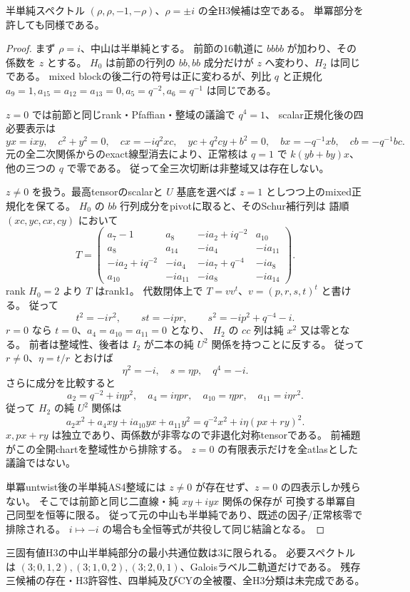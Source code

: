 \begin{theorem}
\label{thm:cubic-fourth-root-last-negative-simple-empty}
半単純スペクトル $(\rho,\rho,-1,-\rho)$、$\rho=\pm i$ の全H3候補は空である。
単冪部分を許しても同様である。
\end{theorem}
\begin{proof}
まず $\rho=i$、中山は半単純とする。
前節の16軌道に $bbbb$ が加わり、その係数を $z$ とする。
$H_0$ は前節の行列の $bb,bb$ 成分だけが $z$ へ変わり、$H_2$ は同じである。
mixed blockの後二行の符号は正に変わるが、列比 $q$ と正規化
$a_9=1,a_{15}=a_{12}=a_{13}=0,a_5=q^{-2},a_6=q^{-1}$ は同じである。

$z=0$ では前節と同じrank・Pfaffian・整域の議論で $q^4=1$、
scalar正規化後の四必要表示は
\[
 yx=ixy,\quad c^2+y^2=0,\quad cx=-iq^2xc,\quad
 yc+q^2cy+b^2=0,\quad bx=-q^{-1}xb,\quad cb=-q^{-1}bc.
\]
元の全二次関係からのexact線型消去により、正常核は
$q=1$ で $k(yb+by)x$、他の三つの $q$ で零である。
従って全三次切断は非整域又は存在しない。

$z\ne0$ を扱う。最高tensorのscalarと $U$ 基底を選べば $z=1$ としつつ上のmixed正規化を保てる。
$H_0$ の $bb$ 行列成分をpivotに取ると、そのSchur補行列は
語順 $(xc,yc,cx,cy)$ において
\[
 T=\begin{pmatrix}
 a_7-1&a_8&-ia_2+iq^{-2}&a_{10}\\
 a_8&a_{14}&-ia_4&-ia_{11}\\
 -ia_2+iq^{-2}&-ia_4&-ia_7+q^{-4}&-ia_8\\
 a_{10}&-ia_{11}&-ia_8&-ia_{14}
 \end{pmatrix}.
\]
rank $H_0=2$ より $T$ はrank1。
代数閉体上で $T=v v^t$、$v=(p,r,s,t)^t$ と書ける。
従って
\[
 t^2=-ir^2,\qquad st=-ipr,\qquad
 s^2=-ip^2+q^{-4}-i.
\]
$r=0$ なら $t=0$、$a_4=a_{10}=a_{11}=0$ となり、
$H_2$ の $cc$ 列は純 $x^2$ 又は零となる。
前者は整域性、後者は $I_2$ が二本の純 $U^2$ 関係を持つことに反する。
従って $r\ne0$、$\eta=t/r$ とおけば
\[
 \eta^2=-i,\quad s=\eta p,\quad q^4=-i.
\]
さらに成分を比較すると
\[
 a_2=q^{-2}+i\eta p^2,\quad a_4=i\eta pr,\quad
 a_{10}=\eta pr,\quad a_{11}=i\eta r^2.
\]
従って $H_2$ の純 $U^2$ 関係は
\[
 a_2x^2+a_4xy+ia_{10}yx+a_{11}y^2
 =q^{-2}x^2+i\eta(px+ry)^2.
\]
$x,px+ry$ は独立であり、両係数が非零なので非退化対称tensorである。
前補題がこの全開chartを整域性から排除する。
$z=0$ の有限表示だけを全atlasとした議論ではない。

単冪untwist後の半単純AS4整域には $z\ne0$ が存在せず、$z=0$ の四表示しか残らない。
そこでは前節と同じ二直線・純 $xy+iyx$ 関係の保存が
可換する単冪自己同型を恒等に限る。
従って元の中山も半単純であり、既述の因子/正常核零で排除される。
$i\mapsto-i$ の場合も全恒等式が共役して同じ結論となる。
\end{proof}

\begin{corollary}
\label{cor:cubic-three-eigenvalue-order3-only}
三固有値H3の中山半単純部分の最小共通位数は3に限られる。
必要スペクトルは $(3;0,1,2),(3;1,0,2),(3;2,0,1)$、Galoisラベル二軌道だけである。
残存三候補の存在・H3許容性、四単純及びCYの全被覆、全H3分類は未完成である。
\end{corollary}
